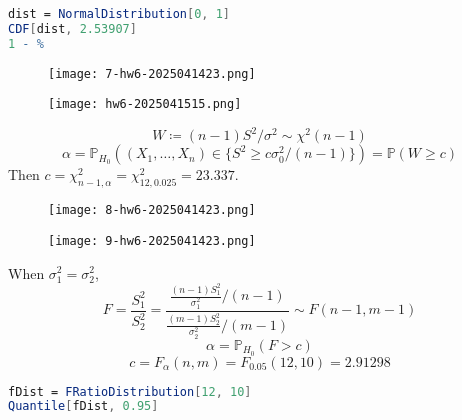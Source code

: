 \begin{lstlisting}[language=mathematica]
dist = NormalDistribution[0, 1]
CDF[dist, 2.53907]
1 - %
\end{lstlisting}
\begin{exercise}
\begin{figure}[H]
\centering
\texttt{[image: 7-hw6-2025041423.png]}
\label{}
\end{figure}
\begin{figure}[H]
\centering
\texttt{[image: hw6-2025041515.png]}
\label{}
\end{figure}
\end{exercise}
\[
W\coloneqq (n-1)S^2/\sigma^{2}\sim \chi^{2}(n-1)
\]
\[
\alpha=\mathbb{P}_{H_0}((X_1,\dots,X_n)\in \{ S^2\geq c\sigma_0^2/(n-1) \})=\mathbb{P}(W\geq c)
\]
Then $c=\chi^{2}_{n-1,\alpha}=\chi^{2}_{12,0.025}=23.337$.

\begin{exercise}
\begin{figure}[H]
\centering
\texttt{[image: 8-hw6-2025041423.png]}
\label{}
\end{figure}
\begin{figure}[H]
\centering
\texttt{[image: 9-hw6-2025041423.png]}
\label{}
\end{figure}
\end{exercise}
When $\sigma^{2}_{1}=\sigma_2^2$,
\[
F=\frac{S_1^2}{S_2^2}=\frac{\frac{(n-1)S_1^2}{\sigma_1^2}/(n-1)}{\frac{(m-1)S_2^2}{\sigma_2^2}/(m-1)}\sim F(n-1,m-1)
\]
\[
\alpha=\mathbb{P}_{H_0}(F>c)
\]
\[
c=F_{\alpha}(n,m)=F_{0.05}(12,10)=2.91298
\]
\begin{lstlisting}[language=mathematica]
fDist = FRatioDistribution[12, 10]
Quantile[fDist, 0.95]
\end{lstlisting}